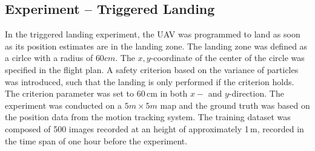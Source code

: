 \subsection{Experiment -- Triggered Landing}

In the triggered landing experiment, the UAV was programmed to land as soon as its position estimates are in the landing zone. The landing zone was defined as a cirlce with a radius of $60cm$. The $x,y$-coordinate of the center of the circle was specified in the flight plan. A safety criterion based on the variance of particles was introduced, such that the landing is only performed if the criterion holds. The criterion parameter was set to 60\,cm in both $x-$ and $y$-direction. The experiment was conducted on a $5m \times 5m$ map and the ground truth was based on the position data from the motion tracking system. The training dataset was composed of 500 images recorded at an height of approximately 1\,m, recorded in the time span of one hour before the experiment.   